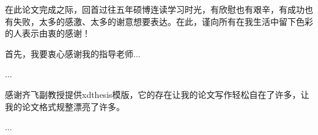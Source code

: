 
\begin{acknowledgments}

在此论文完成之际，回首过往五年硕博连读学习时光，有欣慰也有艰辛，有成功也有失败，太多的感激、太多的谢意想要表达。在此，谨向所有在我生活中留下色彩的人表示由衷的感谢！

首先，我要衷心感谢我的指导老师...

...

感谢齐飞副教授提供xdthesis模版，它的存在让我的论文写作轻松自在了许多，让我的论文格式规整漂亮了许多。

...

\end{acknowledgments}

